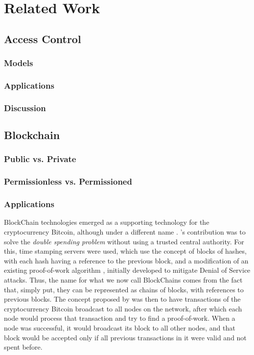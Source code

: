 \chapter{Related Work} 

\section{Access Control}

\subsection{Models}

\subsection{Applications}

\subsection{Discussion}

\section{Blockchain}

\subsection{Public vs. Private}

\subsection{Permissionless vs. Permissioned}

\subsection{Applications}

BlockChain technologies emerged as a supporting technology for the cryptocurrency Bitcoin, although under a different name \cite{nakamoto_bitcoin:_2008}. \citeauthor{nakamoto_bitcoin:_2008}'s contribution was to solve the \textit{double spending problem} without using a trusted central authority. For this, time stamping servers were used, which use the concept of blocks of hashes, with each hash having a reference to the previous block, and a modification of an existing proof-of-work algorithm \cite{back_hashcash_2002}, initially developed to mitigate Denial of Service attacks. Thus, the name for what we now call BlockChains comes from the fact that, simply put, they can be represented as chains of blocks, with references to previous blocks. The concept proposed by \citeauthor{nakamoto_bitcoin:_2008} was then to have transactions of the cryptocurrency Bitcoin broadcast to all nodes on the network, after which each node would process that transaction and try to find a proof-of-work. When a node was successful, it would broadcast its block to all other nodes, and that block would be accepted only if all previous transactions in it were valid and not spent before.
  
